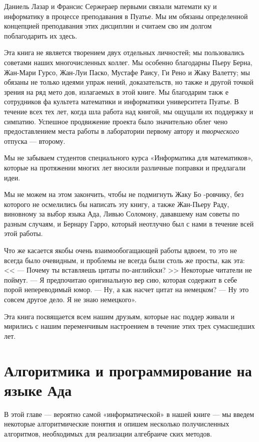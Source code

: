 	Даниель  Лазар  и  Франсис  Сержераер  первыми  связали математи­
	ку и информатику в процессе преподавания в Пуатье. Мы им обязаны 
	определенной концепцией преподавания этих дисциплин и считаем сво­
	им долгом поблагодарить их здесь.	
	
	\pagebreak
	Эта книга не является творением двух отдельных личностей; мы 
	пользовались советами  наших  многочисленных  коллег.  Мы  особенно 
	благодарны Пьеру Берна, Жан-Мари Гурсо, Жан-Луи Паско, Мустафе 
	Раису, Ги Рено и Жаку Валетту; мы обязаны не только идеями упраж­
	нений, доказательств, но также и другой точкой зрения на ряд мето­
	дов,  излагаемых  в этой  книге.  Мы  благодарим такж е сотрудников фа­
	культета математики  и  информатики университета Пуатье.  В течение 
	всех тех лет,  когда шла работа над  книгой, мы ощущали их поддержку 
	и  симпатию.  Успешное  продвижение  проекта  было значительно облег­
	чено  предоставлением  места  работы  в  лаборатории  первому  автору и 
	\textit{творческого} отпуска —  второму.
	
	\parindent=1cm Мы  не  забываем  студентов  специального  курса  «Информатика для 
	математиков»,  которые  на протяжении  многих лет  вносили  различные 
	поправки  и  предлагали  идеи.
	
	\parindent=1cm Мы  не  можем  на  этом закончить,  чтобы  не  подмигнуть Жаку Бо 
	-ровчику,  без  которого  не  осмелились  бы  написать  эту  книгу,  а также 
	Жан-Пьеру  Раду,  виновному  за   выбор  языка  Ада,  Ливью  Соломону, 
	дававшему  нам  советы  по  разным  случаям,  и  Бернару  Гарро,  который 
	неотлучно  был  с  нами  в течение  всей  этой  работы.
	
	\parindent=1cm Что же  касается  якобы очень  взаимообогащающей  работы  вдвоем, 
	то это не всегда было очевидным, и проблемы не всегда были столь 
	же просты, как эта: << — Почему ты  вставляешь цитаты  по-английски? >>
	Некоторые  читатели  не  поймут.  — Я  предпочитаю  оригинальную  вер­
	сию, которая содержит в себе порой непереводимый  юмор. — Ну, а как 
	насчет цитат на немецком?  —  Ну это совсем другое дело. Я не знаю 
	немецкого».
	
	\parindent=1cm Эта  книга посвящается всем нашим друзьям, которые нас поддер­
	живали и мирились с нашим переменчивым настроением в течение этих 
	трех сумасшедших лет.
	\chapter{Алгоритмика и \newline программирование на \newline языке Ада}
	\noindent В этой главе — вероятно самой «информатической» в нашей книге —
	мы введем некоторые алгоритмические понятия и опишем несколько
	получисленных алгоритмов, необходимых для реализации алгебраиче­
	ских методов.
	

